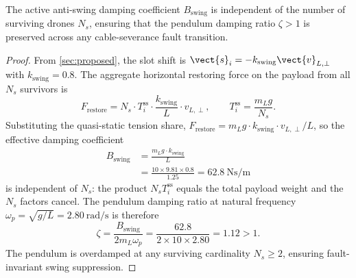 \begin{lemma}
\label{lem:antiswing-invariant}
The active anti-swing damping coefficient $B_{\mathrm{swing}}$ is independent of the number of surviving drones $N_s$, ensuring that the pendulum damping ratio $\zeta > 1$ is preserved across any cable-severance fault transition.
\end{lemma}

\begin{proof}
From \cref{sec:proposed}, the slot shift is $\vect{s}_i = -k_{\mathrm{swing}} \vect{v}_{L,\perp}$ with $k_{\mathrm{swing}} = 0.8$. The aggregate horizontal restoring force on the payload from all $N_s$ survivors is
\begin{equation}
  F_{\mathrm{restore}}
    = N_s \cdot T_i^{\mathrm{ss}}
    \cdot \frac{k_{\mathrm{swing}}}{L} \cdot v_{L,\perp},
    \qquad
  T_i^{\mathrm{ss}} = \frac{m_L g}{N_s}.
\end{equation}
Substituting the quasi-static tension share, $F_{\mathrm{restore}} = m_L g \cdot k_{\mathrm{swing}} \cdot v_{L,\perp}/L$, so the effective damping coefficient
\begin{align}
  B_{\mathrm{swing}}
    &= \frac{m_L g \cdot k_{\mathrm{swing}}}{L}\\
    &= \frac{10 \times 9.81 \times 0.8}{1.25}
    = \SI{62.8}{\newton\second\per\metre}\nonumber
\end{align}
is independent of $N_s$: the product $N_s T_i^{\mathrm{ss}}$ equals the total payload weight and the $N_s$ factors cancel. The pendulum damping ratio at natural frequency $\omega_p = \sqrt{g/L} = \SI{2.80}{\radian\per\second}$ is therefore
\begin{equation}
  \zeta = \frac{B_{\mathrm{swing}}}{2 m_L \omega_p}
    = \frac{62.8}{2 \times 10 \times 2.80} = 1.12 > 1.
\end{equation}
The pendulum is overdamped at any surviving cardinality $N_s \ge 2$, ensuring fault-invariant swing suppression.
\end{proof}

